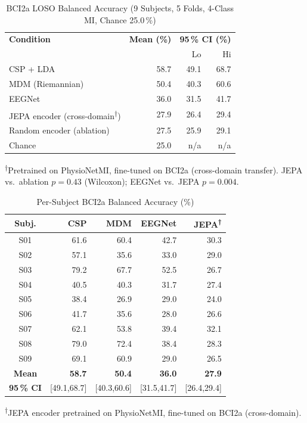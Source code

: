\documentclass[journal]{IEEEtran}
\begin{document}
\begin{table}[t]
\centering
\caption{BCI2a LOSO Balanced Accuracy (9 Subjects, 5 Folds, 4-Class MI, Chance 25.0\,\%)}
\label{tab:bci2a}
\begin{tabular}{lrrr}
\toprule
\textbf{Condition} & \textbf{Mean (\%)} & \multicolumn{2}{c}{\textbf{95\,\% CI (\%)}} \\
 & & Lo & Hi \\
\midrule
CSP + LDA            & 58.7 & 49.1 & 68.7 \\
MDM (Riemannian)     & 50.4 & 40.3 & 60.6 \\
EEGNet~\cite{lawhern2018eegnet} & 36.0 & 31.5 & 41.7 \\
JEPA encoder (cross-domain\textsuperscript{†}) & 27.9 & 26.4 & 29.4 \\
Random encoder (ablation) & 27.5 & 25.9 & 29.1 \\
\midrule
Chance               & 25.0 & n/a & n/a \\
\bottomrule
\end{tabular}
\vspace{0.2em}
{\footnotesize \textsuperscript{†}Pretrained on PhysioNetMI, fine-tuned on BCI2a (cross-domain transfer). JEPA vs.\ ablation $p=0.43$ (Wilcoxon); EEGNet vs.\ JEPA $p=0.004$.}
\end{table}

\begin{table}[t]
\centering
\caption{Per-Subject BCI2a Balanced Accuracy (\%)}
\label{tab:bci2a_persubject}
\setlength{\tabcolsep}{4pt}
\begin{tabular}{crrrr}
\toprule
\textbf{Subj.} & \textbf{CSP} & \textbf{MDM} & \textbf{EEGNet} & \textbf{JEPA\textsuperscript{†}} \\
\midrule
S01 & 61.6 & 60.4 & 42.7 & 30.3 \\
S02 & 57.1 & 35.6 & 33.0 & 29.0 \\
S03 & 79.2 & 67.7 & 52.5 & 26.7 \\
S04 & 40.5 & 40.3 & 31.7 & 27.4 \\
S05 & 38.4 & 26.9 & 29.0 & 24.0 \\
S06 & 41.7 & 35.6 & 28.0 & 26.6 \\
S07 & 62.1 & 53.8 & 39.4 & 32.1 \\
S08 & 79.0 & 72.4 & 38.4 & 28.3 \\
S09 & 69.1 & 60.9 & 29.0 & 26.5 \\
\midrule
\textbf{Mean} & \textbf{58.7} & \textbf{50.4} & \textbf{36.0} & \textbf{27.9} \\
\textbf{95\,\% CI} & [49.1,68.7] & [40.3,60.6] & [31.5,41.7] & [26.4,29.4] \\
\bottomrule
\end{tabular}
\vspace{0.2em}
{\footnotesize \textsuperscript{†}JEPA encoder pretrained on PhysioNetMI, fine-tuned on BCI2a (cross-domain).}
\end{table}
\end{document}
